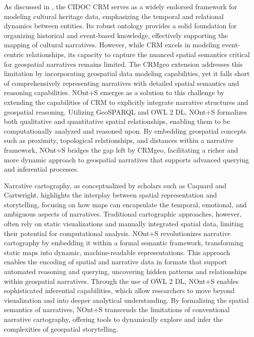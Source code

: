 As discussed in , the CIDOC CRM serves as a widely endorsed framework for modeling cultural heritage data, emphasizing the temporal and relational dynamics between entities. Its robust ontology provides a solid foundation for organizing historical and event-based knowledge, effectively supporting the mapping of cultural narratives. However, while CRM excels in modeling event-centric relationships, its capacity to capture the nuanced spatial semantics critical for geospatial narratives remains limited. The CRMgeo extension addresses this limitation by incorporating geospatial data modeling capabilities, yet it falls short of comprehensively representing narratives with detailed spatial semantics and reasoning capabilities. NOnt+S emerges as a solution to this challenge by extending the capabilities of CRM to explicitly integrate narrative structures and geospatial reasoning. Utilizing GeoSPARQL and OWL 2 DL, NOnt+S formalizes both qualitative and quantitative spatial relationships, enabling them to be computationally analyzed and reasoned upon. By embedding geospatial concepts such as proximity, topological relationships, and distances within a narrative framework, NOnt+S bridges the gap left by CRMgeo, facilitating a richer and more dynamic approach to geospatial narratives that supports advanced querying and inferential processes.

Narrative cartography, as conceptualized by scholars such as Caquard and Cartwright\cite{caquardNarrativeCartographyMapping2014}, highlights the interplay between spatial representation and storytelling, focusing on how maps can encapsulate the temporal, emotional, and ambiguous aspects of narratives. Traditional cartographic approaches, however, often rely on static visualizations and manually integrated spatial data, limiting their potential for computational analysis. NOnt+S revolutionizes narrative cartography by embedding it within a formal semantic framework, transforming static maps into dynamic, machine-readable representations. This approach enables the encoding of spatial and narrative data in formats that support automated reasoning and querying, uncovering hidden patterns and relationships within geospatial narratives. Through the use of OWL 2 DL, NOnt+S enables sophisticated inferential capabilities, which allow researchers to move beyond visualization and into deeper analytical understanding. By formalizing the spatial semantics of narratives, NOnt+S transcends the limitations of conventional narrative cartography, offering tools to dynamically explore and infer the complexities of geospatial storytelling.

